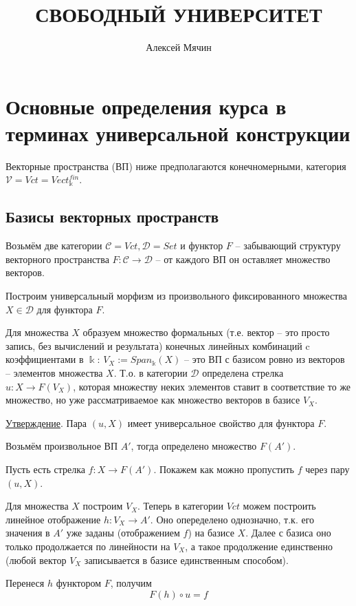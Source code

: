 \documentclass[a4paper, 12pt]{article}
\title{СВОБОДНЫЙ УНИВЕРСИТЕТ}
\date{}
\author{Алексей Мячин}
\begin{document}
\maketitle
\section*{ Основные определения курса в терминах универсальной конструкции }

{\quad}

Векторные пространства (ВП) ниже предполагаются конечномерными, категория $\mathcal{V} = Vct = Vect^{fin}_\Bbbk$.

\subsection*{Базисы векторных пространств}

Возьмём две категории $\mathcal{C} = Vct, \mathcal{D} = Set$ и функтор $F$ -- забывающий структуру векторного пространства $F: \mathcal{C} \to \mathcal{D}$ -- от каждого ВП он оставляет множество векторов.

Построим универсальный морфизм из произвольного фиксированного множества $X \in \mathcal{D}$ для функтора $F$.

Для множества $X$ образуем множество формальных (т.е. вектор -- это просто запись, без вычислений и результата) конечных линейных комбинаций c коэффициентами в $\Bbbk$: $V_X := Span_\Bbbk(X)$ -- это ВП с базисом ровно из векторов -- элементов множества $X$.
Т.о. в категории $\mathcal{D}$ определена стрелка $u: X \to F(V_X)$, которая множеству неких элементов ставит в соответствие то же множество, но уже рассматриваемое как множество векторов в базисе $V_X$.

\medskip
\underline{Утверждение}. Пара $(u, X)$ имеет универсальное свойство для функтора $F$.

Возьмём произвольное ВП $A'$, тогда определено множество $F(A')$.

Пусть есть стрелка $f: X \to F(A')$. Покажем как можно пропустить $f$ через пару $(u, X)$.

Для множества $X$ построим $V_X$. Теперь в категории $Vct$ можем построить линейное отображение $h: V_X \to A'$. Оно опеределено однозначно, т.к. его значения в $A'$ уже заданы (отображением $f$) на базисе $X$. Далее с базиса оно только продолжается по линейности на $V_X$, а такое продолжение единственно (любой вектор $V_X$ записывается в базисе единственным способом).

Перенеся $h$ функтором $F$, получим
$$ F(h)\circ u = f $$
\end{document}

